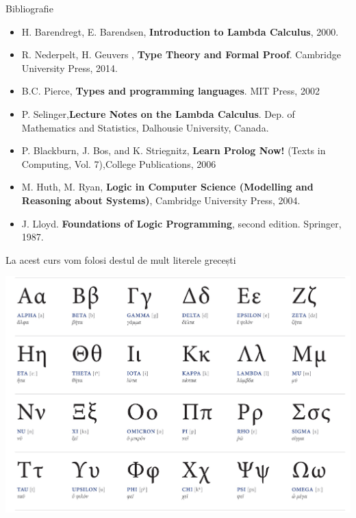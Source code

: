 \documentclass[xcolor=pdftex,romanian,colorlinks]{beamer}
\begin{document}
\begin{frame}{Bibliografie}

{\footnotesize
\begin{itemize}
\item H. Barendregt, E. Barendsen, {\bf Introduction to Lambda Calculus}, 2000.
\item R. Nederpelt, H. Geuvers , {\bf Type Theory and Formal Proof}. Cambridge University Press, 2014.
\item B.C. Pierce,  {\bf Types and programming languages}. MIT Press, 2002
\item P. Selinger,{\bf Lecture Notes on the Lambda Calculus}. Dep. of Mathematics and Statistics, Dalhousie University, Canada.
\item P. Blackburn, J. Bos, and K. Striegnitz, {\bf Learn Prolog Now!} (Texts in Computing, Vol. 7),College Publications, 2006
\item M. Huth, M. Ryan, {\bf Logic in Computer Science (Modelling and Reasoning about Systems)}, Cambridge University Press, 2004.
\item J. Lloyd. {\bf Foundations of Logic Programming}, second edition. Springer, 1987.
\end{itemize}
}
\end{frame}

\begin{frame}{La acest curs vom folosi destul de mult literele grecești}
 
\begin{center}
\vspace{-.6cm}

\includegraphics[scale=.17]{images/GreekAlphabet}
\end{center}
 
 
 \end{frame}
\end{document}
